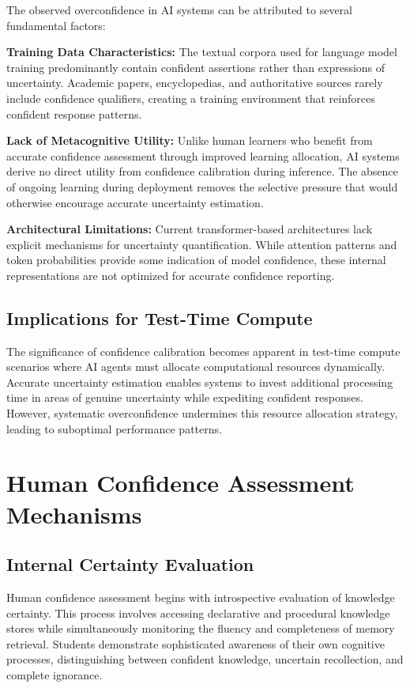 \documentclass[sigconf]{acmart}
\begin{document}
The observed overconfidence in AI systems can be attributed to several fundamental factors:

\textbf{Training Data Characteristics:} The textual corpora used for language model training predominantly contain confident assertions rather than expressions of uncertainty. Academic papers, encyclopedias, and authoritative sources rarely include confidence qualifiers, creating a training environment that reinforces confident response patterns.

\textbf{Lack of Metacognitive Utility:} Unlike human learners who benefit from accurate confidence assessment through improved learning allocation, AI systems derive no direct utility from confidence calibration during inference. The absence of ongoing learning during deployment removes the selective pressure that would otherwise encourage accurate uncertainty estimation.

\textbf{Architectural Limitations:} Current transformer-based architectures lack explicit mechanisms for uncertainty quantification. While attention patterns and token probabilities provide some indication of model confidence, these internal representations are not optimized for accurate confidence reporting.

\subsection{Implications for Test-Time Compute}

The significance of confidence calibration becomes apparent in test-time compute scenarios where AI agents must allocate computational resources dynamically. Accurate uncertainty estimation enables systems to invest additional processing time in areas of genuine uncertainty while expediting confident responses. However, systematic overconfidence undermines this resource allocation strategy, leading to suboptimal performance patterns.

\section{Human Confidence Assessment Mechanisms}

\subsection{Internal Certainty Evaluation}

Human confidence assessment begins with introspective evaluation of knowledge certainty. This process involves accessing declarative and procedural knowledge stores while simultaneously monitoring the fluency and completeness of memory retrieval. Students demonstrate sophisticated awareness of their own cognitive processes, distinguishing between confident knowledge, uncertain recollection, and complete ignorance.
\end{document}
